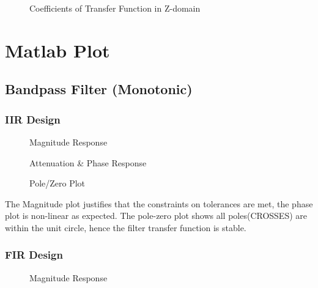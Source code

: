 \documentclass[12pt]{article}
\begin{document}
\begin{figure}[H]
    \caption{Coefficients of Transfer Function in Z-domain}
\end{figure}



\newpage

\section{Matlab Plot}
\subsection{Bandpass Filter (Monotonic)}
\subsubsection{IIR Design}



\begin{figure}[H]
    \caption{Magnitude Response}
\end{figure}

\begin{figure}[H]
    \caption{Attenuation & Phase Response}
\end{figure}


\begin{figure}[H]
    \caption{Pole/Zero Plot}
\end{figure}




The Magnitude plot justifies that the constraints on tolerances are met, the phase plot is non-linear as expected. The pole-zero plot shows all poles(CROSSES) are within the unit circle, hence the filter transfer function is stable.  
\subsubsection{FIR Design}

\begin{figure}[H]
    \caption{Magnitude Response}
\end{figure}
\end{document}
